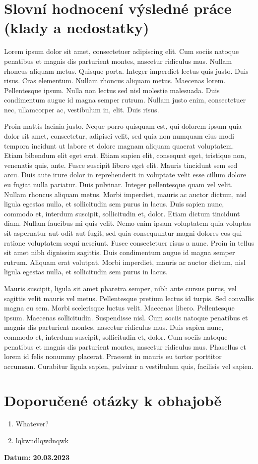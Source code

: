 \documentclass[a4paper,10pt]{article}
\begin{document}
\section*{\sffamily \centering Slovní hodnocení výsledné práce (klady a
nedostatky)}
Lorem ipsum dolor sit amet, consectetuer adipiscing elit. Cum sociis natoque penatibus et magnis dis parturient montes, nascetur ridiculus mus. Nullam rhoncus aliquam metus. Quisque porta. Integer imperdiet lectus quis justo. Duis risus. Cras elementum. Nullam rhoncus aliquam metus. Maecenas lorem. Pellentesque ipsum. Nulla non lectus sed nisl molestie malesuada. Duis condimentum augue id magna semper rutrum. Nullam justo enim, consectetuer nec, ullamcorper ac, vestibulum in, elit. Duis risus.

Proin mattis lacinia justo. Neque porro quisquam est, qui dolorem ipsum quia dolor sit amet, consectetur, adipisci velit, sed quia non numquam eius modi tempora incidunt ut labore et dolore magnam aliquam quaerat voluptatem. Etiam bibendum elit eget erat. Etiam sapien elit, consequat eget, tristique non, venenatis quis, ante. Fusce suscipit libero eget elit. Mauris tincidunt sem sed arcu. Duis aute irure dolor in reprehenderit in voluptate velit esse cillum dolore eu fugiat nulla pariatur. Duis pulvinar. Integer pellentesque quam vel velit. Nullam rhoncus aliquam metus. Morbi imperdiet, mauris ac auctor dictum, nisl ligula egestas nulla, et sollicitudin sem purus in lacus. Duis sapien nunc, commodo et, interdum suscipit, sollicitudin et, dolor. Etiam dictum tincidunt diam. Nullam faucibus mi quis velit. Nemo enim ipsam voluptatem quia voluptas sit aspernatur aut odit aut fugit, sed quia consequuntur magni dolores eos qui ratione voluptatem sequi nesciunt. Fusce consectetuer risus a nunc. Proin in tellus sit amet nibh dignissim sagittis. Duis condimentum augue id magna semper rutrum. Aliquam erat volutpat. Morbi imperdiet, mauris ac auctor dictum, nisl ligula egestas nulla, et sollicitudin sem purus in lacus.

Mauris suscipit, ligula sit amet pharetra semper, nibh ante cursus purus, vel sagittis velit mauris vel metus. Pellentesque pretium lectus id turpis. Sed convallis magna eu sem. Morbi scelerisque luctus velit. Maecenas libero. Pellentesque ipsum. Maecenas sollicitudin. Suspendisse nisl. Cum sociis natoque penatibus et magnis dis parturient montes, nascetur ridiculus mus. Duis sapien nunc, commodo et, interdum suscipit, sollicitudin et, dolor. Cum sociis natoque penatibus et magnis dis parturient montes, nascetur ridiculus mus. Phasellus et lorem id felis nonummy placerat. Praesent in mauris eu tortor porttitor accumsan. Curabitur ligula sapien, pulvinar a vestibulum quis, facilisis vel sapien.

\section*{\sffamily \centering Doporučené otázky k obhajobě}

\begin{enumerate}
  \item Whatever?
\item lqkwndlqwdnqwk
\end{enumerate}

\vfill

\textbf{Datum:
20.03.2023
}
\end{document}

